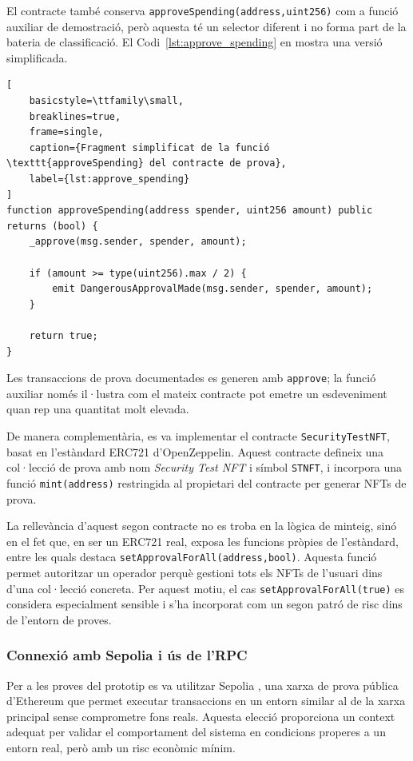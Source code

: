El contracte també conserva \texttt{approveSpending(address,uint256)} com a funció auxiliar de demostració, però aquesta té un selector diferent i no forma part de la bateria de classificació. El Codi~\ref{lst:approve_spending} en mostra una versió simplificada.

\begin{lstlisting}[
    basicstyle=\ttfamily\small,
    breaklines=true,
    frame=single,
    caption={Fragment simplificat de la funció \texttt{approveSpending} del contracte de prova},
    label={lst:approve_spending}
]
function approveSpending(address spender, uint256 amount) public returns (bool) {
    _approve(msg.sender, spender, amount);

    if (amount >= type(uint256).max / 2) {
        emit DangerousApprovalMade(msg.sender, spender, amount);
    }

    return true;
}
\end{lstlisting}

Les transaccions de prova documentades es generen amb \texttt{approve}; la funció auxiliar només il·lustra com el mateix contracte pot emetre un esdeveniment quan rep una quantitat molt elevada.


De manera complementària, es va implementar el contracte \texttt{SecurityTestNFT}, basat en l’estàndard ERC721 d’OpenZeppelin. Aquest contracte defineix una col·lecció de prova amb nom \textit{Security Test NFT} i símbol \texttt{STNFT}, i incorpora una funció \texttt{mint(address)} restringida al propietari del contracte per generar NFTs de prova.

La rellevància d’aquest segon contracte no es troba en la lògica de minteig, sinó en el fet que, en ser un ERC721 real, exposa les funcions pròpies de l’estàndard, entre les quals destaca \texttt{setApprovalForAll(address,bool)}. Aquesta funció permet autoritzar un operador perquè gestioni tots els NFTs de l’usuari dins d’una col·lecció concreta. Per aquest motiu, el cas \texttt{setApprovalForAll(true)} es considera especialment sensible i s’ha incorporat com un segon patró de risc dins de l’entorn de proves.

\subsubsection{Connexió amb Sepolia i ús de l’RPC}

Per a les proves del prototip es va utilitzar Sepolia \cite{ethereum_sepolia}, una xarxa de prova pública d’Ethereum que permet executar transaccions en un entorn similar al de la xarxa principal sense comprometre fons reals. Aquesta elecció proporciona un context adequat per validar el comportament del sistema en condicions properes a un entorn real, però amb un risc econòmic mínim.

